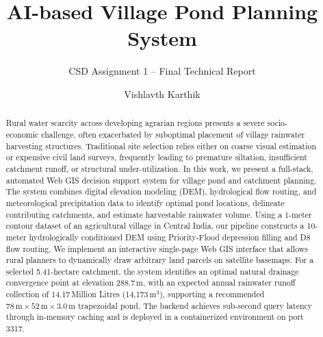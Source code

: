 \documentclass[manuscript,screen,review]{acmart}
\begin{document}
\title{AI-based Village Pond Planning System}
\subtitle{CSD Assignment 1 -- Final Technical Report}

\author{Vishlavth Karthik}

\renewcommand{\shortauthors}{V. Karthik}

\begin{abstract}
Rural water scarcity across developing agrarian regions presents a severe socio-economic challenge, often exacerbated by suboptimal placement of village rainwater harvesting structures. Traditional site selection relies either on coarse visual estimation or expensive civil land surveys, frequently leading to premature siltation, insufficient catchment runoff, or structural under-utilization. In this work, we present a full-stack, automated Web GIS decision support system for village pond and catchment planning. The system combines digital elevation modeling (DEM), hydrological flow routing, and meteorological precipitation data to identify optimal pond locations, delineate contributing catchments, and estimate harvestable rainwater volume. Using a 1-meter contour dataset of an agricultural village in Central India, our pipeline constructs a 10-meter hydrologically conditioned DEM using Priority-Flood depression filling and D8 flow routing. We implement an interactive single-page Web GIS interface that allows rural planners to dynamically draw arbitrary land parcels on satellite basemaps. For a selected 5.41-hectare catchment, the system identifies an optimal natural drainage convergence point at elevation 288.7\,m, with an expected annual rainwater runoff collection of 14.17\,Million Litres (14,173\,$\text{m}^3$), supporting a recommended $78\,\text{m} \times 52\,\text{m} \times 3.0\,\text{m}$ trapezoidal pond. The backend achieves sub-second query latency through in-memory caching and is deployed in a containerized environment on port 3317.
\end{abstract}


\maketitle
\end{document}
